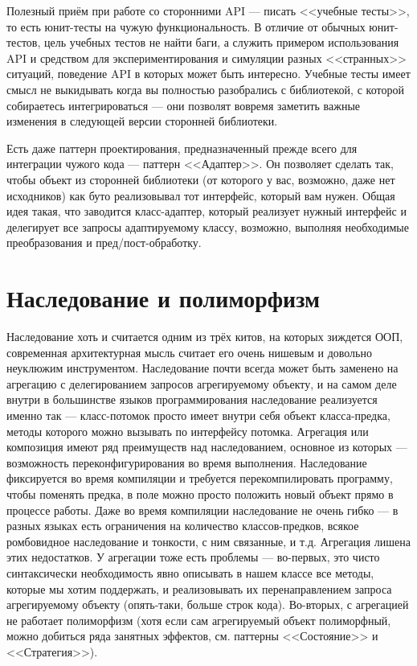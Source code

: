 \documentclass[a5paper]{article}
\begin{document}
Полезный приём при работе со сторонними API --- писать <<учебные тесты>>, то есть юнит-тесты на чужую функциональность. В отличие от обычных юнит-тестов, цель учебных тестов не найти баги, а служить примером использования API и средством для экспериментирования и симуляции разных <<странных>> ситуаций, поведение API в которых может быть интересно. Учебные тесты имеет смысл не выкидывать когда вы полностью разобрались с библиотекой, с которой собираетесь интегрироваться --- они позволят вовремя заметить важные изменения в следующей версии сторонней библиотеки.

Есть даже паттерн проектирования, предназначенный прежде всего для интеграции чужого кода --- паттерн <<Адаптер>>. Он позволяет сделать так, чтобы объект из сторонней библиотеки (от которого у вас, возможно, даже нет исходников) как буто реализовывал тот интерфейс, который вам нужен. Общая идея такая, что заводится класс-адаптер, который реализует нужный интерфейс и делегирует все запросы адаптируемому классу, возможно, выполняя необходимые преобразования и пред/пост-обработку.

\section{Наследование и полиморфизм}

Наследование хоть и считается одним из трёх китов, на которых зиждется ООП, современная архитектурная мысль считает его очень нишевым и довольно неуклюжим инструментом. Наследование почти всегда может быть заменено на агрегацию с делегированием запросов агрегируемому объекту, и на самом деле внутри в большинстве языков программирования наследование реализуется именно так --- класс-потомок просто имеет внутри себя объект класса-предка, методы которого можно вызывать по интерфейсу потомка. Агрегация или композиция имеют ряд преимуществ над наследованием, основное из которых --- возможность переконфигурирования во время выполнения. Наследование фиксируется во время компиляции и требуется перекомпилировать программу, чтобы поменять предка, в поле можно просто положить новый объект прямо в процессе работы. Даже во время компиляции наследование не очень гибко --- в разных языках есть ограничения на количество классов-предков, всякое ромбовидное наследование и тонкости, с ним связанные, и т.д. Агрегация лишена этих недостатков. У агрегации тоже есть проблемы --- во-первых, это чисто синтаксически необходимость явно описывать в нашем классе все методы, которые мы хотим поддержать, и реализовывать их перенаправлением запроса агрегируемому объекту (опять-таки, больше строк кода). Во-вторых, с агрегацией не работает полиморфизм (хотя если сам агрегируемый объект полиморфный, можно добиться ряда занятных эффектов, см. паттерны <<Состояние>> и <<Стратегия>>).
\end{document}
